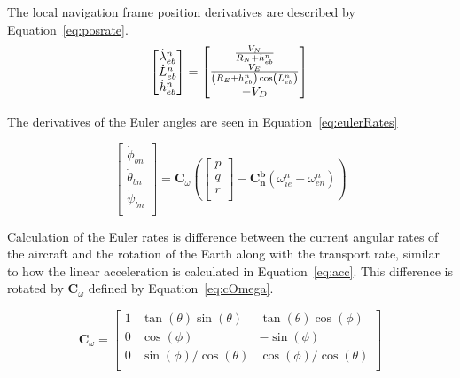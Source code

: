 The local navigation frame position derivatives are described by Equation~\ref{eq:posrate}.
\begin{equation}\label{eq:posrate}
    \begin{bmatrix}
        \dot{\lambda}_{eb}^n \\
        \dot{L}_{eb}^n       \\
        \dot{h}_{eb}^n       \\
    \end{bmatrix} =
    \begin{bmatrix}
        \frac{V_N}{R_N + h_{eb}^n}                                       \\
        \frac{V_E}{\left(R_E + h_{eb}^n\right)\cos\left(L_{eb}^n\right)} \\
        -V_D                                                             \\
    \end{bmatrix}\\
\end{equation}

The derivatives of the Euler angles are seen in Equation~\ref{eq:eulerRates}

\begin{equation}\label{eq:eulerRates}
    \begin{bmatrix}
        \dot{\phi}_{bn}   \\
        \dot{\theta}_{bn} \\
        \dot{\psi}_{bn}   \\
    \end{bmatrix} =
    \mathbf{C}_{\omega}
    \left(
    \begin{bmatrix}
            p \\
            q \\
            r \\
        \end{bmatrix} -
    \mathbf{C_n^b}\left(\omega_{ie}^n + \omega_{en}^n\right)
    \right)
\end{equation}

Calculation of the Euler rates is difference between the current angular rates of the aircraft and the rotation of the Earth along with the transport rate, similar to how the linear acceleration is calculated in Equation~\ref{eq:acc}. This difference is rotated by \(\mathbf{C}_{\omega}\) defined by Equation~\ref{eq:cOmega}.

\begin{equation}\label{eq:cOmega}
    \mathbf{C}_{\omega} =
    \begin{bmatrix}
        1 & \tan(\theta)\sin(\theta)    & \tan(\theta)\cos(\phi)      \\
        0 & \cos(\phi)                  & -\sin(\phi)                 \\
        0 & {\sin(\phi)}/{\cos(\theta)} & {\cos(\phi)}/{\cos(\theta)} \\
    \end{bmatrix}
\end{equation}

